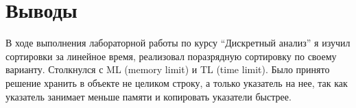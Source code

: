 \section{Выводы}
В ходе выполнения лабораторной работы по курсу \enquote{Дискретный анализ} я изучил сортировки за линейное время, реализовал поразрядную сортировку по своему варианту. Столкнулся с ML (memory limit) и TL (time limit). Было принято решение хранить в объекте не целиком строку, а только указатель на нее, так как указатель занимает меньше памяти и копировать указатели быстрее.
\pagebreak
